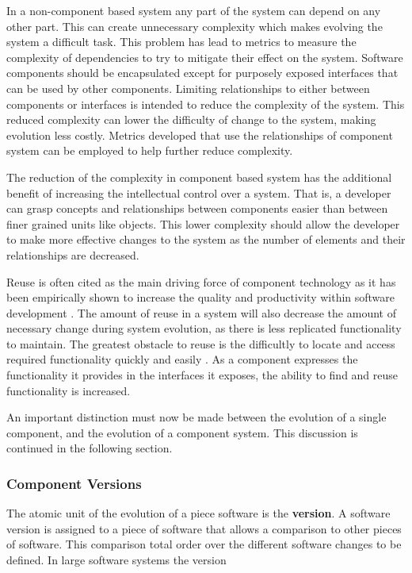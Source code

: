 In a non-component based system any part of the system can depend on any other part.
This can create unnecessary complexity which makes evolving the system a difficult task.
This problem has lead to metrics \citep{martin2003} to measure the complexity of dependencies to try to mitigate their effect on the system.
Software components should be encapsulated except for purposely exposed interfaces that can be used by other components.
Limiting relationships to either between components or interfaces is intended to reduce the complexity of the system.
This reduced complexity can lower the difficulty of change to the system, making evolution less costly.
Metrics \citep{Chen2011} developed that use the relationships of component system can be employed to help further reduce complexity.

The reduction of the complexity in component based system has the additional benefit of increasing the intellectual control over a system.
That is, a developer can grasp concepts and relationships between components easier than between finer grained units like objects.
This lower complexity should allow the developer to make more effective changes to the system 
as the number of elements and their relationships are decreased.

Reuse is often cited as the main driving force of component technology as it has been empirically shown to increase the quality and productivity within software development \citep{hallsteinsen_experiences_1997}.
The amount of reuse in a system will also decrease the amount of necessary change during system evolution, as there is less replicated functionality to maintain.
The greatest obstacle to reuse is the difficultly to locate and access required functionality quickly and easily \citep{Ye2001}.
As a component expresses the functionality it provides in the interfaces it exposes, the ability to find and reuse functionality is increased.

An important distinction must now be made between the evolution of a single component, and the evolution of a component system.
This discussion is continued in the following section.

\subsubsection{Component Versions}
The atomic unit of the evolution of a piece software is the \textbf{version}.
A software version is assigned to a piece of software that allows a comparison to other pieces of software.
This comparison total order over the different software changes to be defined.
In large software systems the version 


